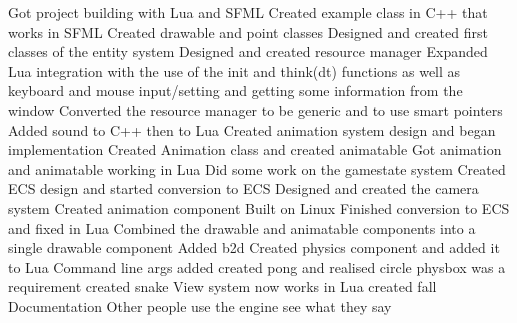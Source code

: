\documentclass[11pt,a4paper,titlepage]{article}
\begin{document}
	Got project building with Lua and SFML
	Created example class in C++ that works in SFML
	Created drawable and point classes
	Designed and created first classes of the entity system
	Designed and created resource manager
	Expanded Lua integration with the use of the init and think(dt) functions as well as  keyboard and mouse input/setting and getting some information from the window
	Converted the resource manager to be generic and to use smart pointers
	Added sound to C++ then to Lua
	Created animation system design and began implementation
	Created Animation class and created animatable
	Got animation and animatable working in Lua
	Did some work on the gamestate system
	Created ECS design and started conversion to ECS	
	Designed and created the camera system
	Created animation component
	Built on Linux
	Finished conversion to ECS and fixed in Lua
	Combined the drawable and animatable components into a single drawable component
	Added b2d
	Created physics component and added it to Lua
	Command line args added
	created pong and realised circle physbox was a requirement
	created snake
	View system now works in Lua
	created fall
	Documentation
	Other people use the engine
	see what they say

	\printbibliography{}
\end{document}
